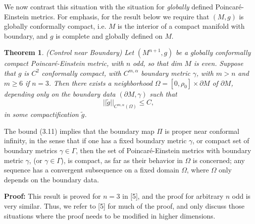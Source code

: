 \documentclass[11pt,amsfonts]{amsart}
\newtheorem{theorem}{Theorem}[section]
\begin{document}
\medskip

 We now contrast this situation with the situation for {\it globally} 
defined Poincar\'e-Einstein metrics. For emphasis, for the result below 
we require that $(M, g)$ is globally conformally compact, i.e. $M$ is the 
interior of a compact manifold with boundary, and $g$ is complete and 
globally defined on $M$. 

\begin{theorem} \label{t 3.4.} {\rm  (Control near Boundary)}
 Let $(M^{n+1}, g)$ be a globally conformally compact Poincar\'e-Einstein 
metric, with $n$ odd, so that dim $M$ is even. Suppose that $g$ is 
$C^{2}$ conformally compact, with $C^{m,\alpha}$ boundary metric 
$\gamma$, with $m > n$ and $m \geq 6$ if $n = 3$. Then there exists a 
neighborhood $\Omega = [0,\rho_{0}]\times \partial M$ of $\partial M$, 
depending only on the boundary data $(\partial M, \gamma)$ such that
\begin{equation} \label{e3.11}
||\widetilde g||_{C^{m,\alpha}(\Omega)} \leq  C, 
\end{equation}
in some compactification $\widetilde g$.
\end{theorem}

 The bound (3.11) implies that the boundary map $\Pi$ is proper near 
conformal infinity, in the sense that if one has a fixed boundary 
metric $\gamma$, or compact set of boundary metrics $\gamma \in  
\Gamma$, then the set of Poincar\'e-Einstein metrics with boundary 
metric $\gamma$, (or $\gamma\in\Gamma$), is compact, as far as their 
behavior in $\Omega$ is concerned; any sequence has a convergent 
subsequence on a fixed domain $\Omega$, where $\Omega$ only depends 
on the boundary data. 

\noindent
{\bf Proof:}
 This result is proved for $n = 3$ in [5], and the proof for arbitrary 
$n$ odd is very similar. Thus, we refer to [5] for much of the proof, 
and only discuss those situations where the proof needs to be modified 
in higher dimensions. 
\end{document}
